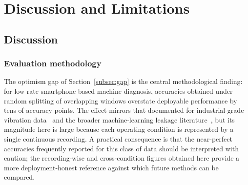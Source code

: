 
\section{Discussion and Limitations}
\label{sec:discussion}

\subsection{Discussion}

\subsubsection{Evaluation methodology}
The optimism gap of Section~\ref{subsec:gap} is the central methodological
finding: for low-rate smartphone-based machine diagnosis, accuracies obtained under
random splitting of overlapping windows overstate deployable performance by tens
of accuracy points. The effect mirrors that documented for industrial-grade
vibration data~\cite{wheat2024impact, hendriks2022towards} and the broader
machine-learning leakage literature~\cite{kapoor2023leakage}, but its magnitude
here is large because each operating condition is represented by a single
continuous recording. A practical consequence is that the near-perfect accuracies
frequently reported for this class of data should be interpreted with caution; the
recording-wise and cross-condition figures obtained here provide a more
deployment-honest reference against which future methods can be compared.

